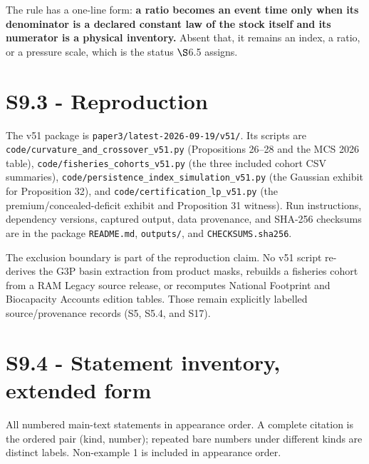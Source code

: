 \documentclass[11pt]{article}
\begin{document}
The rule has a one-line form: \textbf{a ratio becomes an event time only when its denominator is a declared constant law of the stock itself and its numerator is a physical inventory.} Absent that, it remains an index, a ratio, or a pressure scale, which is the status \(\S\)6.5 assigns.

\vspace{0.8em}

\section*{S9.3 - Reproduction}\label{s93---reproduction}

The v51 package is \texttt{paper3/latest-2026-09-19/v51/}. Its scripts are \texttt{code/curvature\_and\_crossover\_v51.py} (Propositions 26--28 and the MCS 2026 table), \texttt{code/fisheries\_cohorts\_v51.py} (the three included cohort CSV summaries), \texttt{code/persistence\_index\_simulation\_v51.py} (the Gaussian exhibit for Proposition 32), and \texttt{code/certification\_lp\_v51.py} (the premium/concealed-deficit exhibit and Proposition 31 witness). Run instructions, dependency versions, captured output, data provenance, and SHA-256 checksums are in the package \texttt{README.md}, \texttt{outputs/}, and \texttt{CHECKSUMS.sha256}.

The exclusion boundary is part of the reproduction claim. No v51 script re-derives the G3P basin extraction from product masks, rebuilds a fisheries cohort from a RAM Legacy source release, or recomputes National Footprint and Biocapacity Accounts edition tables. Those remain explicitly labelled source/provenance records (S5, S5.4, and S17).

\section*{S9.4 - Statement inventory, extended form}\label{s94---statement-inventory-extended-form}

All numbered main-text statements in appearance order. A complete citation is the ordered pair (kind, number); repeated bare numbers under different kinds are distinct labels. Non-example 1 is included in appearance order.
\end{document}
